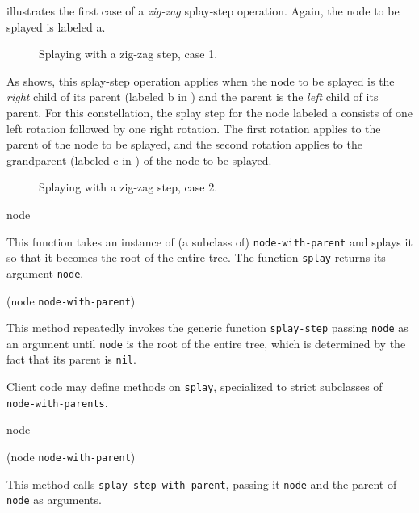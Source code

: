  illustrates the first case of a
\emph{zig-zag} splay-step operation.  Again, the node to be splayed is
labeled \textsf{a}.

\begin{figure}
\begin{center}
\end{center}
\caption{\label{fig-splay-zig-zag-1}
Splaying with a zig-zag step, case 1.}
\end{figure}

As  shows, this splay-step operation
applies when the node to be splayed is the \emph{right} child of its
parent (labeled \textsf{b} in ) and the
parent is the \emph{left} child of its parent.  For this
constellation, the splay step for the node labeled \textsf{a} consists
of one left rotation followed by one right rotation.  The first
rotation applies to the parent of the node to be splayed, and the
second rotation applies to the grandparent (labeled \textsf{c} in
) of the node to be splayed.

\begin{figure}
\begin{center}
\end{center}
\caption{\label{fig-splay-zig-zag-2}
Splaying with a zig-zag step, case 2.}
\end{figure}

 {node}

This function takes an instance of (a subclass of)
\texttt{node-with-parent} and splays it so that it becomes the root of
the entire tree.  The function \texttt{splay} returns its argument
\texttt{node}.

 {(node \texttt{node-with-parent})}

This method repeatedly invokes the generic function
\texttt{splay-step} passing \texttt{node} as an argument until
\texttt{node} is the root of the entire tree, which is determined by
the fact that its parent is \texttt{nil}.

Client code may define methods on \texttt{splay}, specialized to
strict subclasses of \texttt{node-with-parents}.

 {node}

 {(node \texttt{node-with-parent})}

This method calls \texttt{splay-step-with-parent}, passing it
\texttt{node} and the parent of \texttt{node} as arguments.

